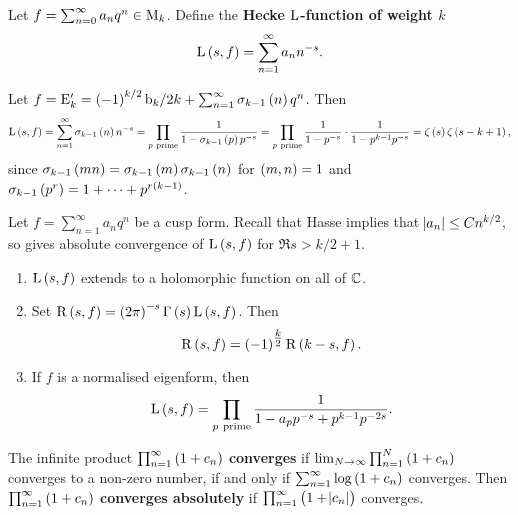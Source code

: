 \begin{definition}
Let $ f = \sum_{n = 0}^\infty a_nq^n \in \mathrm{M}_k $. Define the \textbf{Hecke $ \mathrm{L} $-function of weight $ k $}
$$ \L\br{s, f} = \sum_{n = 1}^\infty a_nn^{-s}. $$
\end{definition}

\begin{example*}
Let $ f = \E_k' = \br{-1}^{k / 2}\b_k / 2k + \sum_{n = 1}^\infty \sigma_{k - 1}\br{n}q^n $. Then
$$ \L\br{s, f} = \sum_{n = 1}^\infty \sigma_{k - 1}\br{n}n^{-s} = \prod_{p \ \text{prime}} \dfrac{1}{1 - \sigma_{k - 1}\br{p}p^{-s}} = \prod_{p \ \text{prime}} \dfrac{1}{1 - p^{-s}} \cdot \dfrac{1}{1 - p^{k - 1}p^{-s}} = \zeta\br{s}\zeta\br{s - k + 1}, $$
since $ \sigma_{k - 1}\br{mn} = \sigma_{k - 1}\br{m}\sigma_{k - 1}\br{n} $ for $ \br{m, n} = 1 $ and $ \sigma_{k - 1}\br{p^r} = 1 + \dots + p^{r\br{k - 1}} $.
\end{example*}


Let $ f = \sum_{n = 1}^\infty a_nq^n $ be a cusp form. Recall that Hasse implies that $ \abs{a_n} \le Cn^{k / 2} $, so gives absolute convergence of $ \L\br{s, f} $ for $ \Re s > k / 2 + 1 $.

\begin{theorem}
\label{thm:lfunction}
\hfill
\begin{enumerate}
\item $ \L\br{s, f} $ extends to a holomorphic function on all of $ \mathbb{C} $.
\item Set $ \R\br{s, f} = \br{2\pi}^{-s}\Gamma\br{s}\L\br{s, f} $. Then
$$ \R\br{s, f} = \br{-1}^{\tfrac{k}{2}}\R\br{k - s, f}. $$
\item If $ f $ is a normalised eigenform, then
$$ \L\br{s, f} = \prod_{p \ \text{prime}} \dfrac{1}{1 - a_pp^{-s} + p^{k - 1}p^{-2s}}. $$
\end{enumerate}
\end{theorem}

\begin{definition}
The infinite product $ \prod_{n = 1}^\infty \br{1 + c_n} $ \textbf{converges} if $ \lim_{N \to \infty} \prod_{n = 1}^N \br{1 + c_n} $ converges to a non-zero number, if and only if $ \sum_{n = 1}^\infty \log \br{1 + c_n} $ converges. Then $ \prod_{n = 1}^\infty \br{1 + c_n} $ \textbf{converges absolutely} if $ \prod_{n = 1}^\infty \br{1 + \abs{c_n}} $ converges.
\end{definition}

\pagebreak

